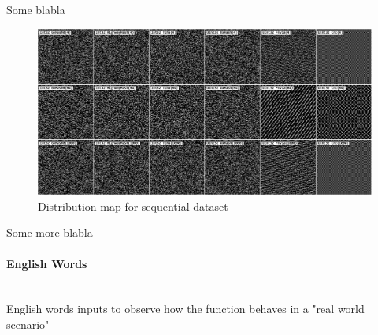 \documentclass[10pt]{article}
\begin{document}
Some blabla

\begin{figure}[H]
\centering
\includegraphics[width=1\textwidth]{quality-sequential.png}
\caption{Distribution map for sequential dataset}
\label{fig:quality-sequential}
\end{figure}

Some more blabla

\clearpage
\paragraph{English Words}\leavevmode\\
English words inputs to observe how the function behaves in a "real world scenario"
\end{document}
